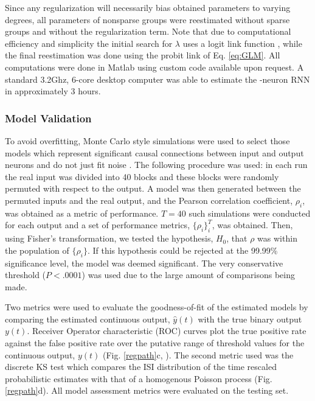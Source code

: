 \documentclass[11pt,a4paper,final]{article}
\begin{document}
Since any regularization will necessarily bias obtained parameters to varying degrees, all parameters of nonsparse groups were reestimated without sparse groups and without the regularization term.
Note that due to computational efficiency and simplicity the initial search for $\lambda$ uses a logit link function \citep{breheny15}, while the final reestimation was done using the probit link of Eq. \ref{eq:GLM}.
All computations were done in Matlab using custom code available upon request.
A standard 3.2Ghz, 6-core desktop computer was able to estimate the \nn{}-neuron RNN in approximately 3 hours.

\subsubsection{Model Validation \label{MtV}}
To avoid overfitting, Monte Carlo style simulations were used to select those models which represent significant causal connections between input and output neurons and do not just fit noise \citep{sandler14}.
The following procedure was used: in each run the real input was divided into 40 blocks and these blocks were randomly permuted with respect to the output.
A model was then generated between the permuted inputs and the real output, and the Pearson correlation coefficient, $\rho_{i}$, was obtained as a metric of performance.
$T=40$ such simulations were conducted for each output and a set of performance metrics, $\{\rho_{i}\}_{i}^{T}$, was obtained.
Then, using Fisher's transformation, we tested the hypothesis, $H_{0}$, that $\rho$ was within the population of $\{\rho_{i}\}$.
If this hypothesis could be rejected at the 99.99\% significance level, the model was deemed significant.
The very conservative threshold ($P<.0001$) was used due to the large amount of comparisons being made.

Two metrics were used to evaluate the goodness-of-fit of the estimated models by comparing the estimated continuous output, $\hat{y}(t)$ with the true binary output $y(t)$.
Receiver Operator characteristic (ROC) curves plot the true positive rate against the false positive rate over the putative range of threshold values for the continuous output, $y(t)$ (Fig. \ref{regpath}c, \citet{zanos08}).
The second metric used was the discrete KS test \citep{haslinger10,song13sparse} which compares the ISI distribution of the time rescaled probabilistic estimates with that of a homogenous Poisson process (Fig. \ref{regpath}d).
All model assessment metrics were evaluated on the testing set.
\end{document}
